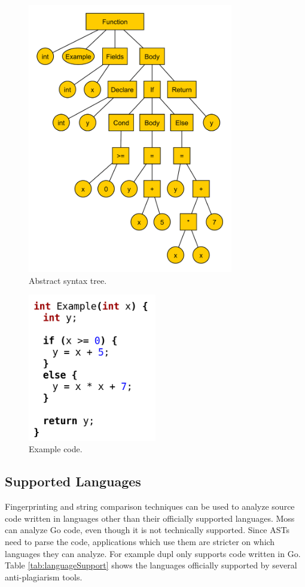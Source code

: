 \documentclass[10pt,journal,compsoc]{IEEEtran}
\begin{document}
			\begin{figure}
				\includegraphics[width=0.8\textwidth]{AST.pdf}
				\caption{Abstract syntax tree.}
				\label{fig:ast}
			\end{figure}
			\begin{figure}
				\includegraphics[width=0.5\textwidth]{ASTcode.png}
				\caption{Example code.}
				\label{fig:astcode}
			\end{figure}
		
		\subsection{Supported Languages}
		Fingerprinting and string comparison techniques can be used to analyze source code written in languages other than their officially supported languages. Moss can analyze Go code, even though it is not technically supported. Since ASTs need to parse the code, applications which use them are stricter on which languages they can analyze. For example dupl only supports code written in Go. Table \ref{tab:languageSupport} shows the languages officially supported by several anti-plagiarism tools.
		
\end{document}
